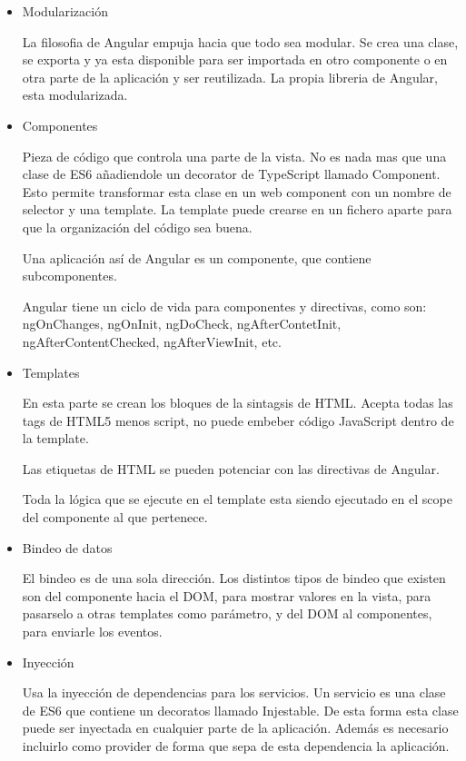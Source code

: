 \documentclass[a4paper, 12pt]{book}
\begin{document}
\begin{itemize}
  \item Modularizaci\'on

	La filosofia de Angular empuja hacia que todo sea modular. Se crea una clase, se exporta y ya esta disponible para ser importada en otro componente o en otra parte de la aplicaci\'on y ser reutilizada. La propia libreria de Angular, esta modularizada.

  \item Componentes

Pieza de c\'odigo que controla una parte de la vista. No es nada mas que una clase de ES6 a\~nadiendole un decorator de TypeScript  llamado Component. Esto permite transformar esta clase en un web component con un nombre de selector y una template. La template puede crearse en un fichero aparte para que la organizaci\'on del c\'odigo sea buena.

Una aplicaci\'on as\'i de Angular es un componente, que contiene subcomponentes.

Angular tiene un ciclo de vida para componentes y directivas, como son: ngOnChanges, ngOnInit, ngDoCheck, ngAfterContetInit, ngAfterContentChecked, ngAfterViewInit, etc.

   \item Templates

En esta parte se crean los bloques de la sintagsis de HTML. Acepta todas las tags de HTML5 menos script, no puede embeber c\'odigo JavaScript dentro de la template.

Las etiquetas de HTML se pueden potenciar con las directivas de Angular.

Toda la l\'ogica que se ejecute en el template esta siendo ejecutado en el scope del componente al que pertenece.

\item Bindeo de datos

El bindeo es de una sola direcci\'on. Los distintos tipos de bindeo que existen son del componente hacia el DOM, para mostrar valores en la vista, para pasarselo a otras templates como par\'ametro, y del DOM al componentes, para enviarle los eventos.

\item Inyecci\'on

Usa la inyecci\'on de dependencias para los servicios. Un servicio es una clase de ES6 que contiene un decoratos llamado Injestable. De esta forma esta clase puede ser inyectada en cualquier parte de la aplicaci\'on. Adem\'as es necesario incluirlo como provider de forma que sepa de esta dependencia la aplicaci\'on.


\end{itemize}
\end{document}
